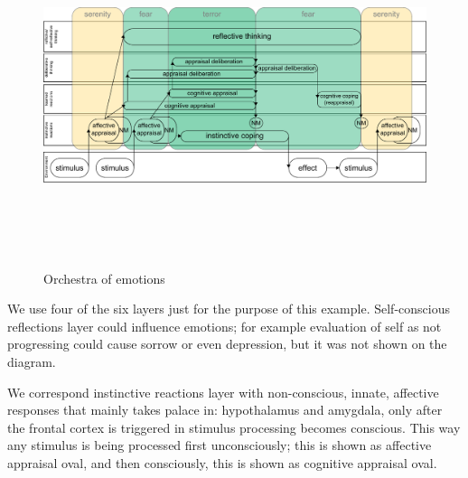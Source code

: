 \begin{figure}
\begin{center}
 \includegraphics[height=10cm, angle=90]{figure2_orchestra_of_emotions}
\end{center}
\caption{Orchestra of emotions \label{orchestra_of_emotions}}
\end{figure}

We use four of the six layers just for the purpose of this example. Self-conscious reflections layer could influence emotions; for example evaluation of self as not progressing could cause sorrow or even depression, but it was not shown on the diagram.

We correspond instinctive reactions layer with non-conscious, innate, affective responses that mainly takes palace in: hypothalamus and amygdala, only after the frontal cortex is triggered in stimulus processing becomes conscious. This way any stimulus is being processed first unconsciously; this is shown as affective appraisal oval, and then consciously, this is shown as cognitive appraisal oval.

